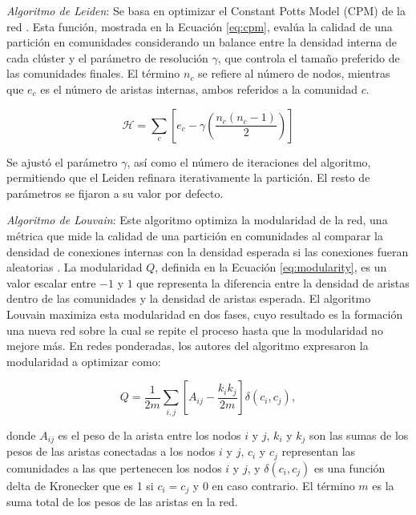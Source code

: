 \textit{Algoritmo de Leiden}: Se basa en optimizar el Constant Potts Model (CPM) de la red \cite{traag2019leiden,constantplottsmodel}. Esta función, mostrada en la Ecuación \ref{eq:cpm}, evalúa la calidad de una partición en comunidades considerando un balance entre la densidad interna de cada clúster y el parámetro de resolución \(\gamma\), que controla el tamaño preferido de las comunidades finales. El término \(n_c\) se refiere al número de nodos, mientras que \(e_c\) es el número de aristas internas, ambos referidos a la comunidad \(c\).

\begin{equation}
	\label{eq:cpm}
	\mathcal{H} = \sum_{c} \left[ e_c - \gamma \left( \frac{n_c (n_c - 1)}{2} \right) \right]
\end{equation}

\noindent Se ajustó el parámetro \(\gamma\), así como el número de iteraciones del algoritmo, permitiendo que el Leiden refinara iterativamente la partición. El resto de parámetros se fijaron a su valor por defecto. 


\textit{Algoritmo de Louvain}: Este algoritmo optimiza la modularidad de la red, una métrica que mide la calidad de una partición en comunidades al comparar la densidad de conexiones internas con la densidad esperada si las conexiones fueran aleatorias \cite{Blondel2008Louvain}. La modularidad \( Q \), definida en la Ecuación \ref{eq:modularity}, es un valor escalar entre \(-1\) y \(1\) que representa la diferencia entre la densidad de aristas dentro de las comunidades y la densidad de aristas esperada. El algoritmo Louvain maximiza esta modularidad en dos fases, cuyo resultado es la formación una nueva red sobre la cual se repite el proceso hasta que la modularidad no mejore más. En redes ponderadas, los autores del algoritmo expresaron la modularidad a optimizar como:

\begin{equation}
	\label{eq:modularity}
	Q = \frac{1}{2m} \sum_{i,j} \left[ A_{ij} - \frac{k_i k_j}{2m} \right] \delta(c_i, c_j),
\end{equation}

\noindent donde \( A_{ij} \) es el peso de la arista entre los nodos \( i \) y \( j \), \( k_i \) y \( k_j \) son las sumas de los pesos de las aristas conectadas a los nodos \( i \) y \( j \), \( c_i \) y \( c_j \) representan las comunidades a las que pertenecen los nodos \( i \) y \( j \), y \( \delta(c_i, c_j) \) es una función delta de Kronecker que es 1 si \( c_i = c_j \) y 0 en caso contrario. El término \( m \) es la suma total de los pesos de las aristas en la red.

